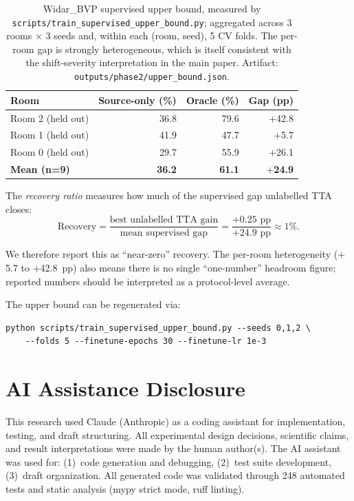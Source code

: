 \begin{table}[h]
\centering
\caption{Widar\_BVP supervised upper bound, measured by \texttt{scripts/train\_supervised\_upper\_bound.py}; aggregated across 3 rooms $\times$ 3 seeds and, within each (room, seed), 5 CV folds. The per-room gap is strongly heterogeneous, which is itself consistent with the shift-severity interpretation in the main paper. Artifact: \texttt{outputs/phase2/upper\_bound.json}.}
\label{tab:upperbound}
\small
\begin{tabular}{lrrr}
\toprule
\textbf{Room} & \textbf{Source-only (\%)} & \textbf{Oracle (\%)} & \textbf{Gap (pp)} \\
\midrule
Room 2 (held out) & 36.8 & 79.6 & $+$42.8 \\
Room 1 (held out) & 41.9 & 47.7 & $+$5.7 \\
Room 0 (held out) & 29.7 & 55.9 & $+$26.1 \\
\midrule
\textbf{Mean (n=9)} & \textbf{36.2} & \textbf{61.1} & \textbf{$+$24.9} \\
\bottomrule
\end{tabular}
\end{table}

The \emph{recovery ratio} measures how much of the supervised gap unlabelled TTA closes:
\[
  \text{Recovery} = \frac{\text{best unlabelled TTA gain}}{\text{mean supervised gap}}
  = \frac{+0.25\text{ pp}}{+24.9\text{ pp}} \approx 1\%.
\]

We therefore report this as ``near-zero'' recovery. The per-room heterogeneity ($+$5.7 to $+$42.8~pp) also means there is no single ``one-number'' headroom figure; reported numbers should be interpreted as a protocol-level average.

The upper bound can be regenerated via:
\begin{verbatim}
python scripts/train_supervised_upper_bound.py --seeds 0,1,2 \
    --folds 5 --finetune-epochs 30 --finetune-lr 1e-3
\end{verbatim}

\section{AI Assistance Disclosure}
\label{app:ai}

This research used Claude (Anthropic) as a coding assistant for implementation, testing, and draft structuring. All experimental design decisions, scientific claims, and result interpretations were made by the human author(s). The AI assistant was used for: (1)~code generation and debugging, (2)~test suite development, (3)~draft organization. All generated code was validated through 248 automated tests and static analysis (mypy strict mode, ruff linting).
